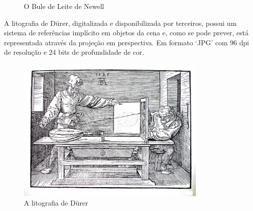 \begin{figure}[!htb]
	\centering
	\quad
	\caption{O Bule de Leite de Newell}
	\label{utahMilkjugDuplo}
\end{figure}

	A litografia de Dürer, digitalizada e disponibilizada por terceiros, possui um sistema de referências implícito em objetos da cena e, como se pode prever, está representada através da projeção em perspectiva. Em formato `JPG' com 96 dpi de resolução e 24 bits de profundidade de cor.
	
\begin{figure}[!htb]
	\centering
	\includegraphics[height=7cm]{imagens/durer.jpg}
	\caption{A litografia de Dürer \cite{durerSite}}
	\label{durerPerspectiva}
\end{figure}
	
